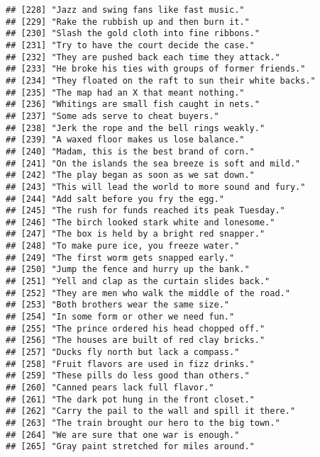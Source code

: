 \documentclass[
]{article}
\begin{document}
\begin{verbatim}
## [228] "Jazz and swing fans like fast music."                     
## [229] "Rake the rubbish up and then burn it."                    
## [230] "Slash the gold cloth into fine ribbons."                  
## [231] "Try to have the court decide the case."                   
## [232] "They are pushed back each time they attack."              
## [233] "He broke his ties with groups of former friends."         
## [234] "They floated on the raft to sun their white backs."       
## [235] "The map had an X that meant nothing."                     
## [236] "Whitings are small fish caught in nets."                  
## [237] "Some ads serve to cheat buyers."                          
## [238] "Jerk the rope and the bell rings weakly."                 
## [239] "A waxed floor makes us lose balance."                     
## [240] "Madam, this is the best brand of corn."                   
## [241] "On the islands the sea breeze is soft and mild."          
## [242] "The play began as soon as we sat down."                   
## [243] "This will lead the world to more sound and fury."         
## [244] "Add salt before you fry the egg."                         
## [245] "The rush for funds reached its peak Tuesday."             
## [246] "The birch looked stark white and lonesome."               
## [247] "The box is held by a bright red snapper."                 
## [248] "To make pure ice, you freeze water."                      
## [249] "The first worm gets snapped early."                       
## [250] "Jump the fence and hurry up the bank."                    
## [251] "Yell and clap as the curtain slides back."                
## [252] "They are men who walk the middle of the road."            
## [253] "Both brothers wear the same size."                        
## [254] "In some form or other we need fun."                       
## [255] "The prince ordered his head chopped off."                 
## [256] "The houses are built of red clay bricks."                 
## [257] "Ducks fly north but lack a compass."                      
## [258] "Fruit flavors are used in fizz drinks."                   
## [259] "These pills do less good than others."                    
## [260] "Canned pears lack full flavor."                           
## [261] "The dark pot hung in the front closet."                   
## [262] "Carry the pail to the wall and spill it there."           
## [263] "The train brought our hero to the big town."              
## [264] "We are sure that one war is enough."                      
## [265] "Gray paint stretched for miles around."                   

\end{verbatim}
\end{document}
